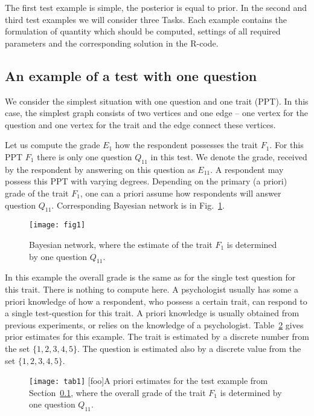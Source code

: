 \documentclass[12pt]{article}
\begin{document}
The first test example is simple, the posterior is equal to prior. In the second and third test examples we will consider three Tasks. Each example contains the formulation of quantity which should be computed, settings of all required parameters and the corresponding solution in the R-code. 

\subsection{An example of a test with one question}
\label{sec:Ex1}
We consider the simplest situation with one question and one trait (PPT). In this case, the simplest graph consists of two vertices and one edge -- one vertex for the question and one vertex for the trait and the edge connect these vertices.

Let us compute the grade $E_1$ how the respondent possesses the trait $F_1$. 
For this PPT $F_1$ there is only one question $Q_{11}$ in this test. We denote the grade, received by the respondent by answering on this question as $E_{11}$.
A respondent may possess this PPT with varying degrees. Depending on the primary (a priori) grade of the trait $F_1$, one can a priori assume how respondents will answer question $Q_{11}$.  Corresponding Bayesian network is in Fig.~\ref{fig:fig1}.

%
\begin{figure}[!ht]
 \centering
  \texttt{[image: fig1]}
 \caption{Bayesian network, where the estimate of the trait $F_1$ is determined by one question $Q_{11}$.}
  \label{fig:fig1}
\end{figure}

In this example the overall grade is the same as for the single test question for this trait. There is nothing to compute here. A psychologist usually has some a priori knowledge of how a respondent, who possess a certain trait, can respond to a single test-question for this trait. A priori knowledge is usually obtained from previous experiments, or relies on the knowledge of a psychologist. Table~\ref{tab1} gives prior estimates for this example. The trait is estimated by a discrete number from the set $\{1, 2, 3, 4, 5\}$. The question is estimated also by a discrete value from the set $\{1, 2, 3, 4, 5\}$.

%
\begin{figure}[!ht]
\centering
\texttt{[image: tab1]}
[foo]{A priori estimates for the test example from Section~\ref {sec:Ex1}, where the overall grade of the trait $F_1$ is determined by one question $Q_{11}$.}
  \label{tab1}
\end{figure}
%
\end{document}
